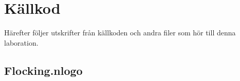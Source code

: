 \documentclass[titlepage, a4paper, 12pt]{article}
\begin{document}



\newpage
\appendix
{}
\section{Källkod}\label{sec:kallkod}
Härefter följer utskrifter från källkoden och andra filer som hör till
denna laboration.

\subsection{Flocking.nlogo}\label{app:Flocking.nlogo}
\begin{footnotesize}
  
\end{footnotesize}
\end{document}
